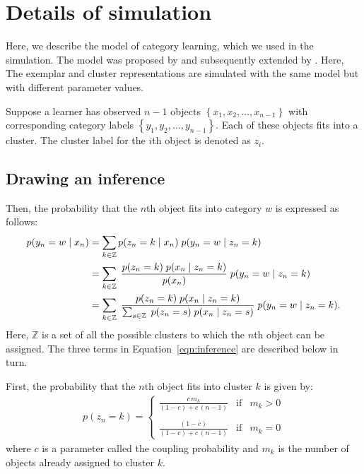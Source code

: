 \documentclass[doc]{apa6}
\begin{document}
\printbibliography{}

\appendix

\section{Details of simulation}
\label{appendix:model}

Here, we describe the model of category learning, which we used in the simulation. The model was
proposed by \textcite{Anderson1991a} and subsequently extended by \textcite{Sanborn2010a}. Here, The
exemplar and cluster representations are simulated with the same model but with different parameter
values.

Suppose a learner has observed $n - 1$ objects $\left\{x_{1}, x_{2}, \dots, x_{n - 1}\right\}$ with
corresponding category labels $\left\{y_{1}, y_{2}, \dots, y_{n - 1}\right\}$.  Each of these
objects fits into a cluster. The cluster label for the $i$th object is denoted as $z_{i}$.

\subsection{Drawing an inference}

Then, the probability that the $n$th object fits into category $w$ is expressed as follows:
\begin{align}
    p(y_{n} = w \; \vert \; x_{n})
    &= \sum_{k \in \mathbb{Z}} p(z_{n} = k \; \vert \; x_{n}) \; p(y_{n} = w \; \vert \; z_{n} = k) \notag\\
    &= \sum_{k \in \mathbb{Z}} \; \frac{p(z_{n} = k) \; p(x_{n} \;\vert\; z_{n} = k)}{p(x_{n})} \; p(y_{n} = w \; \vert \; z_{n} =
    k) \notag\\
    &= \sum_{k \in \mathbb{Z}} \; \frac{p(z_{n} = k) \; p(x_{n} \;\vert\; z_{n} = k)}{\sum_{s \in
    \mathbb{Z}} \; p(z_{n} = s) \; p(x_{n} \;\vert\; z_{n} = s)} \; p(y_{n} = w \; \vert \; z_{n} = k).
\label{eqn:inference}
\end{align}
Here, $\mathbb{Z}$ is a set of all the possible clusters to which the $n$th object can be assigned.
The three terms in Equation~\ref{eqn:inference} are described below in turn.

First, the probability that the $n$th object fits into cluster $k$ is given by:
\begin{align}
    p(z_{n} = k) = \left\{
        \begin{array}{rcl}
            \displaystyle \frac{c\,m_{k}}{(1 - c) + c\,(n - 1)} & \mbox{if} & m_{k} > 0\\
            \\
            \displaystyle \frac{(1 - c)}{(1 - c) + c\,(n - 1)} & \mbox{if} & m_{k} = 0
        \end{array}
    \right.
\label{eqn:prior}
\end{align}
where $c$ is a parameter called the coupling probability and $m_{k}$ is the number of objects
already assigned to cluster $k$.
\end{document}
